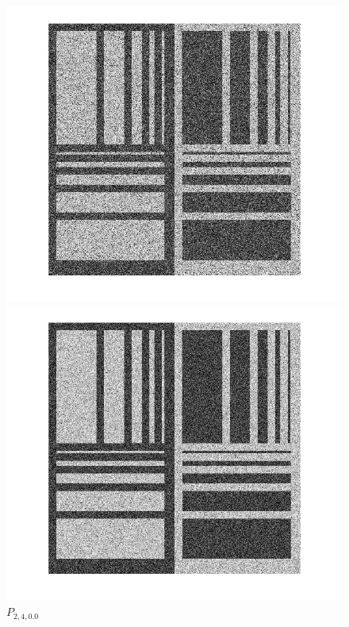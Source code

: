 \documentclass[12pt,a4paper]{article}
\begin{document}
\begin{figure}[!htb]
  \includegraphics[width=\linewidth]{Eq_Phantom_0p000_2_3_1_histeq.jpg}
	\caption{$P_{2,3,0.0}$}\label{fig:awesome_image1}
\endminipage\hfill
{}
  \includegraphics[width=\linewidth]{Eq_Phantom_0p000_2_4_1_histeq.jpg}
	\caption{$P_{2,4,0.0}$}\label{fig:awesome_image1}
\endminipage\hfill
{}%

\end{figure}
\end{document}
